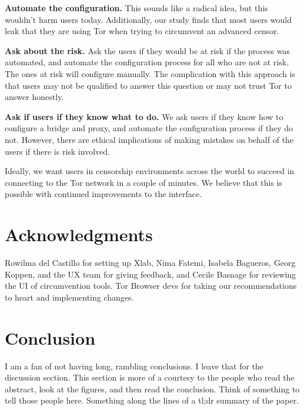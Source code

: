 \documentclass[USenglish,oneside,twocolumn]{article}
\begin{document}
\begin{description}
\item{\bfseries Automate the configuration.} This sounds like a radical idea, but this wouldn't harm users today. Additionally, our study finds that most users would leak that they are using Tor when trying to circumvent an advanced censor. 
\item{\bfseries Ask about the risk.} Ask the users if they would be at risk if the process was automated, and automate the configuration process for all who are not at risk. The ones at risk will configure manually. The complication with this approach is that users may not be qualified to answer this question or may not trust Tor to answer honestly. 
\item{\bfseries Ask if users if they know what to do.} We ask users if they know how to configure a bridge and proxy, and automate the configuration process if they do not. However, there are ethical implications of making mistakes on behalf of the users if there is risk involved. 
\end{description}

Ideally, we want users in censorship environments across the world to succeed in connecting to the Tor network in a couple of minutes. We believe that this is possible with continued improvements to the interface. 

\section {Acknowledgments}
{\color {red} Rowilma del Castillo for setting up Xlab, Nima Fatemi, Isabela Bagueros, Georg Koppen, and the UX team for giving feedback, and Cecile Basnage for reviewing the UI of circumvention tools.} 
{\color {red} Tor Browser devs for taking our recommendations to heart and implementing changes.}

\section{Conclusion} 
{\color {red} I am a fan of not having long, rambling conclusions. I leave
that for the discussion section. This section is more of a courtesy to the 
people who read the abstract, look at the figures, and then read the 
conclusion. Think of something to tell those people here. Something along
the lines of a tl;dr summary of the paper.} 


\nocite{*}

\end{document}
